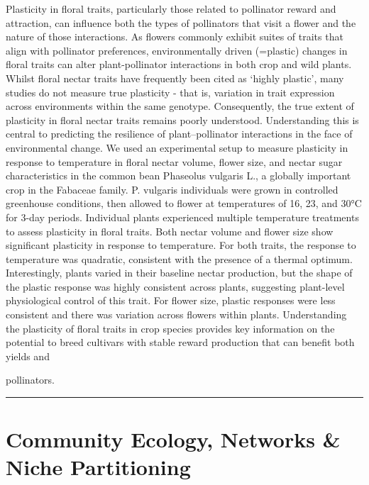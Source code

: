 \documentclass[
  letterpaper,
  DIV=11,
  numbers=noendperiod]{scrartcl}
\begin{document}
Plasticity in floral traits, particularly those related to pollinator
reward and attraction, can influence both the types of pollinators that
visit a flower and the nature of those interactions. As flowers commonly
exhibit suites of traits that align with pollinator preferences,
environmentally driven (=plastic) changes in floral traits can alter
plant-pollinator interactions in both crop and wild plants. Whilst
floral nectar traits have frequently been cited as `highly plastic',
many studies do not measure true plasticity - that is, variation in
trait expression across environments within the same genotype.
Consequently, the true extent of plasticity in floral nectar traits
remains poorly understood. Understanding this is central to predicting
the resilience of plant--pollinator interactions in the face of
environmental change. We used an experimental setup to measure
plasticity in response to temperature in floral nectar volume, flower
size, and nectar sugar characteristics in the common bean Phaseolus
vulgaris L., a globally important crop in the Fabaceae family. P.
vulgaris individuals were grown in controlled greenhouse conditions,
then allowed to flower at temperatures of 16, 23, and 30°C for 3-day
periods. Individual plants experienced multiple temperature treatments
to assess plasticity in floral traits. Both nectar volume and flower
size show significant plasticity in response to temperature. For both
traits, the response to temperature was quadratic, consistent with the
presence of a thermal optimum. Interestingly, plants varied in their
baseline nectar production, but the shape of the plastic response was
highly consistent across plants, suggesting plant-level physiological
control of this trait. For flower size, plastic responses were less
consistent and there was variation across flowers within plants.
Understanding the plasticity of floral traits in crop species provides
key information on the potential to breed cultivars with stable reward
production that can benefit both yields and

pollinators.

\begin{center}\rule{0.5\linewidth}{0.5pt}\end{center}

\section{Community Ecology, Networks \& Niche
Partitioning}\label{community-ecology-networks-niche-partitioning}
\end{document}

